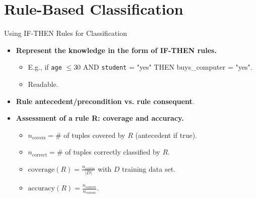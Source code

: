 \section{Rule-Based Classification}

\begin{frame}{Using \uppercase{if-then} Rules for Classification}
  \begin{itemize}
  \item \textbf{Represent the knowledge in the form of {\color{airforceblue}IF-THEN rules}.}
    \begin{itemize}
    \item E.g., if \texttt{age} $\leq 30$ AND \texttt{student} = "yes" THEN buys\_computer = "yes".
    \item Readable.
    \end{itemize}
  \item \textbf{Rule {\color{airforceblue}antecedent/precondition} vs. rule {\color{airforceblue}consequent}}.
  \item \textbf{Assessment of a rule R: coverage and accuracy.}
    \begin{itemize}
    \item $n_{\text{covers}} = \#$ of tuples covered by $R$ (antecedent if true).
    \item $n_{\text{correct}} = \#$ of tuples correctly classified by $R$.
    \item $\text{coverage}(R) = \frac{n_{\text{covers}}}{|D|}$ with $D$ training data set.
    \item $\text{accuracy}(R) = \frac{n_{\text{correct}}}{n_{\text{covers}}}$.
    \end{itemize}
  \end{itemize}
\end{frame}

